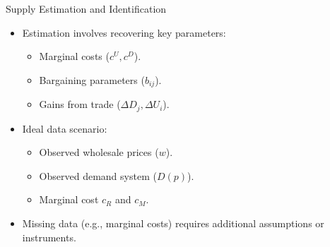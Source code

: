 \documentclass[aspectratio=169]{beamer}  %
\begin{document}


\begin{frame}{Supply Estimation and Identification}
    \begin{itemize}
        \item Estimation involves recovering key parameters:
        \begin{itemize}
            \item Marginal costs (\(c^U, c^D\)).
            \item Bargaining parameters (\(b_{ij}\)).
            \item Gains from trade (\(\Delta D_j, \Delta U_i\)).
        \end{itemize}
        \item Ideal data scenario:
        \begin{itemize}
            \item Observed wholesale prices (\(w\)).
            \item Observed demand system (\(D(p)\)).
            \item Marginal cost $c_R$ and $c_M$.
        \end{itemize}
        \item Missing data (e.g., marginal costs) requires additional assumptions or instruments.
    \end{itemize}
\end{frame}
\end{document}
